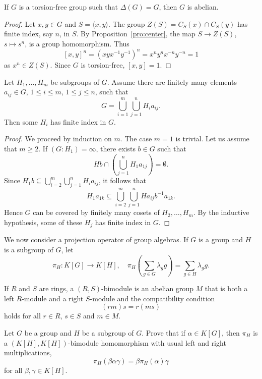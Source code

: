 \chapter{}

\begin{proposition}
	\label{pro:FCabeliano}
	If $G$ is a torsion-free group such 
	that $\Delta(G)=G$, then $G$ is abelian.
\end{proposition}

\begin{proof}
	Let $x,y\in G$ and $S=\langle x,y\rangle$. The group $Z(S)=C_S(x)\cap C_S(y)$ has 
	finite index, say $n$, in $S$. By Proposition~\ref{pro:center}, 
	the map $S\to Z(S)$, $s\mapsto s^n$, is a group homomorphism. Thus  
	\[
		[x,y]^n=(xyx^{-1}y^{-1})^n=x^ny^nx^{-n}y^{-n}=1
	\]
	as $x^n\in Z(S)$. Since $G$ is torsion-free, $[x,y]=1$.
\end{proof}

\begin{lemma}[Neumann]
	\label{lem:Neumann}
	Let $H_1,\dots,H_m$ be subgroups of $G$. 
	Assume there are finitely many elements
	$a_{ij}\in G$, $1\leq i\leq m$, $1\leq j\leq n$, such that 
	\[
		G=\bigcup_{i=1}^m\bigcup_{j=1}^n H_ia_{ij}.
	\]
	Then some $H_i$ has finite index in $G$.
\end{lemma}

\begin{proof}
	We proceed by induction on $m$. The case $m=1$ is trivial. 
	Let us assume that $m\geq2$. If $(G:H_1)=\infty$, there exists $b\in G$
	such that 
	\[
		Hb\cap\left(
	\bigcup_{j=1}^nH_1a_{1j}\right)=\emptyset.
	\]
	Since $H_1b\subseteq\bigcup_{i=2}^m\bigcup_{j=1}^n H_ia_{ij}$, 
	it follows that 
	\[
		H_1a_{1k}\subseteq \bigcup_{i=2}^m\bigcup_{j=1}^n Ha_{ij}b^{-1}a_{1k}.
	\]
	Hence $G$ can be covered by finitely many cosets of $H_2,\dots,H_m$. By the inductive hypothesis, 
	some of these $H_j$ has finite index in $G$.
\end{proof}

We now consider a projection operator of group algebras. If $G$ 
is a group and $H$ is a subgroup of $G$, let 
\[
	\pi_H\colon K[G]\to K[H],\quad
	\pi_H\left(\sum_{g\in G}\lambda_gg\right)=\sum_{g\in H}\lambda_gg.
\]

If $R$ and $S$ are rings, a $(R,S)$-bimodule is an abelian group
$M$ that is both a left $R$-module and a right $S$-module 
and the compatibility condition 
\[
(rm)s = r(ms)
\]
holds for all $r\in R$, $s\in S$ and $m\in M$.


\begin{exercise}
	Let $G$ be a group and $H$ be a subgroup of $G$. Prove that
	if $\alpha\in
	K[G]$, then $\pi_H$ is a $(K[H],K[H])$-bimodule homomorphism
	with usual left and right multiplications,
	\[
		\pi_H(\beta\alpha\gamma)=\beta\pi_H(\alpha)\gamma
	\]
	for all $\beta,\gamma\in K[H]$.
\end{exercise}

